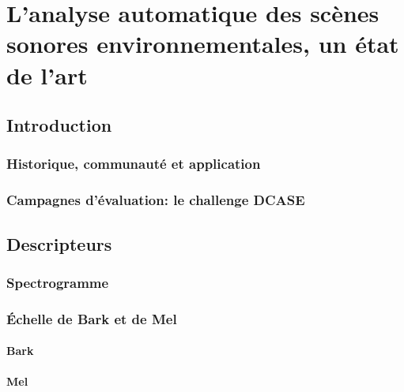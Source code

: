 \chapter[État de l'art]{L'analyse automatique des scènes sonores environnementales, un état de l'art}\label{ch:ml_ea}


\section{Introduction}

\subsection{Historique, communauté et application}


\subsection{Campagnes d'évaluation: le challenge DCASE}
\label{sec:ch6_challengeDcasePresentation}


\section{Descripteurs}

\subsection{Spectrogramme}
\label{sec:ch6_spec}

\subsection{Échelle de Bark et de Mel}

\subsubsection{Bark}
\label{sec:ch6_Bark}

\subsubsection{Mel}
\label{sec:ch6_Mel}


